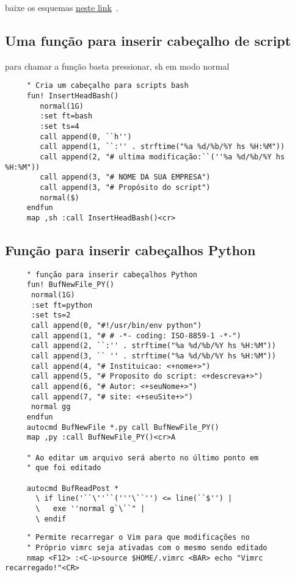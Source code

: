 baixe os esquemas
\href{http://nanasi.jp/old/colorscheme\_0.html}{neste link}~\cite{EsquemasDeCor}.

\subsection{Uma função para inserir cabeçalho de script}
\label{Uma função para inserir cabeçalho de script bash}
para chamar a função
basta pressionar, sh em modo normal

\begin{verbatim}
     " Cria um cabeçalho para scripts bash
     fun! InsertHeadBash()
        normal(1G)
        :set ft=bash
        :set ts=4
        call append(0, ``h'')
        call append(1, ``:'' . strftime("%a %d/%b/%Y hs %H:%M"))
        call append(2, "# ultima modificação:``(''%a %d/%b/%Y hs %H:%M"))
        call append(3, "# NOME DA SUA EMPRESA")
        call append(3, "# Propósito do script")
        normal($)
     endfun
     map ,sh :call InsertHeadBash()<cr>
\end{verbatim}

\subsection{Função para inserir cabeçalhos Python}
\label{Função para inserir cabeçalhos Python}

\begin{verbatim}
     " função para inserir cabeçalhos Python
     fun! BufNewFile_PY()
      normal(1G)
      :set ft=python
      :set ts=2
      call append(0, "#!/usr/bin/env python")
      call append(1, "# # -*- coding: ISO-8859-1 -*-")
      call append(2, ``:'' . strftime("%a %d/%b/%Y hs %H:%M"))
      call append(3, `` '' . strftime("%a %d/%b/%Y hs %H:%M"))
      call append(4, "# Instituicao: <+nome+>")
      call append(5, "# Proposito do script: <+descreva+>")
      call append(6, "# Autor: <+seuNome+>")
      call append(7, "# site: <+seuSite+>")
      normal gg
     endfun
     autocmd BufNewFile *.py call BufNewFile_PY()
     map ,py :call BufNewFile_PY()<cr>A
   
     " Ao editar um arquivo será aberto no último ponto em
     " que foi editado
   
     autocmd BufReadPost *
       \ if line('``\''``('''\``'') <= line(``$'') |
       \   exe ''normal g`\``" |
       \ endif
\end{verbatim}

\begin{verbatim}
     " Permite recarregar o Vim para que modificações no
     " Próprio vimrc seja ativadas com o mesmo sendo editado
     nmap <F12> :<C-u>source $HOME/.vimrc <BAR> echo "Vimrc recarregado!"<CR>
\end{verbatim}

